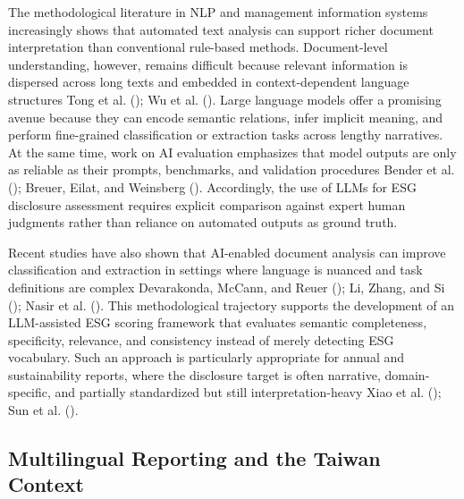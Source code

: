 \documentclass[
  12pt,
]{article}
\begin{document}
The methodological literature in NLP and management information systems
increasingly shows that automated text analysis can support richer
document interpretation than conventional rule-based methods.
Document-level understanding, however, remains difficult because
relevant information is dispersed across long texts and embedded in
context-dependent language structures Tong et al.
(); Wu et al.
(). Large language models offer a promising
avenue because they can encode semantic relations, infer implicit
meaning, and perform fine-grained classification or extraction tasks
across lengthy narratives. At the same time, work on AI evaluation
emphasizes that model outputs are only as reliable as their prompts,
benchmarks, and validation procedures Bender et al.
(); Breuer, Eilat, and Weinsberg
(). Accordingly, the use of LLMs for ESG
disclosure assessment requires explicit comparison against expert human
judgments rather than reliance on automated outputs as ground truth.

Recent studies have also shown that AI-enabled document analysis can
improve classification and extraction in settings where language is
nuanced and task definitions are complex Devarakonda, McCann, and Reuer
(); Li, Zhang, and Si
(); Nasir et al.
(). This methodological trajectory
supports the development of an LLM-assisted ESG scoring framework that
evaluates semantic completeness, specificity, relevance, and consistency
instead of merely detecting ESG vocabulary. Such an approach is
particularly appropriate for annual and sustainability reports, where
the disclosure target is often narrative, domain-specific, and partially
standardized but still interpretation-heavy Xiao et al.
(); Sun et al.
().

\subsection{Multilingual Reporting and the Taiwan
Context}\label{multilingual-reporting-and-the-taiwan-context}
\end{document}
